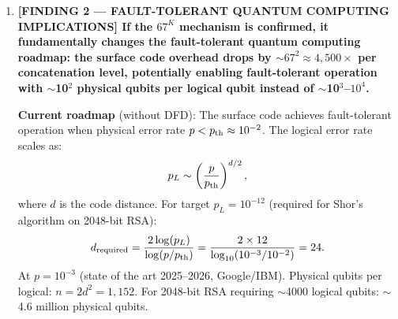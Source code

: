\documentclass[11pt]{article}
\theoremstyle{definition}
\theoremstyle{remark}
\begin{document}
\begin{tcolorbox}[colback=blue!5!white, colframe=blue!60!black,
  title=\textbf{W4i17 TOP 5 FINDINGS --- READ FIRST}]
\begin{enumerate}[nosep]
  \textbf{Seven systematic controls} (Section~\ref{sec:systematics}):
  (i)~$\beta$-scan: sweep $\beta$ from 0 to 5, plot $T_\phi(\beta)$,
  confirm minimum decoherence at $\beta^* = 2.405$;
  (ii)~frequency scan: sweep $\omega_1/2\pi$ from 0.1 to 10\,MHz at
  fixed $\beta^*$, confirm $T_\phi$ enhancement is frequency-independent
  (as predicted);
  (iii)~photon number scan: measure $T_\phi^{(1)}/T_\phi^{(0)}$ at
  $|\alpha|^2 = 2, 4, 6, 8$, confirm ratio is constant (bit-flip rate
  changes, dephasing suppression does not);
  (iv)~temperature scan: measure at $T = 10, 20, 50, 100$\,mK, identify
  thermal photon crossover;
  (v)~magnetic field scan: apply deliberate residual fields $B = 0, 5, 10, 50$\,nT,
  check if $T_\phi$ enhancement persists (it should, since magnetic
  dephasing couples through a different channel);
  (vi)~drive amplitude calibration: verify cat-state $|\alpha|^2$ via
  photon-number-resolved spectroscopy (independent of Wigner);
  (vii)~JPA off control: repeat Ramsey with JPA pump off (no two-photon
  drive, no cat state) to measure bare cavity coherence.

  \textbf{Pass/fail}: Enhancement $T_\phi^{(1)}/T_\phi^{(0)} > 50$ with
  $\beta$-selectivity $> 5\times$ is a PASS. Enhancement $< 10$ or no
  $\beta$-dependence is a FAIL. Intermediate values (10--50) indicate
  partial success with competing noise channels.

  \textbf{Estimated resources}: 1 postdoc + 1 graduate student, 6 months,
  \$200K--\$400K incremental (primarily machine-shop time for JPA housing
  and postdoc salary). All cryogenic, microwave, and control
  infrastructure is existing SQMS equipment.

\item \textbf{[FINDING 2 --- FAULT-TOLERANT QUANTUM COMPUTING IMPLICATIONS]
  If the $67^K$ mechanism is confirmed, it fundamentally changes the
  fault-tolerant quantum computing roadmap: the surface code overhead
  drops by $\sim 67^2 \approx 4{,}500\times$ per concatenation level,
  potentially enabling fault-tolerant operation with $\sim$10$^2$ physical
  qubits per logical qubit instead of $\sim$10$^3$--$10^4$.}

  \textbf{Current roadmap} (without DFD): The surface code achieves
  fault-tolerant operation when physical error rate $p < p_{\rm th} \approx
  10^{-2}$. The logical error rate scales as:
  \begin{equation}
    p_L \sim \left(\frac{p}{p_{\rm th}}\right)^{d/2},
  \end{equation}
  where $d$ is the code distance. For target $p_L = 10^{-12}$ (required
  for Shor's algorithm on 2048-bit RSA):
  \begin{equation}
    d_{\rm required} = \frac{2\log(p_L)}{\log(p/p_{\rm th})}
    = \frac{2 \times 12}{\log_{10}(10^{-3}/10^{-2})} = 24.
  \end{equation}
  At $p = 10^{-3}$ (state of the art 2025--2026, Google/IBM). Physical
  qubits per logical: $n = 2d^2 = 1{,}152$. For 2048-bit RSA requiring
  $\sim$4000 logical qubits: $\sim$4.6 million physical qubits.


\end{enumerate}
\end{tcolorbox}
\end{document}
